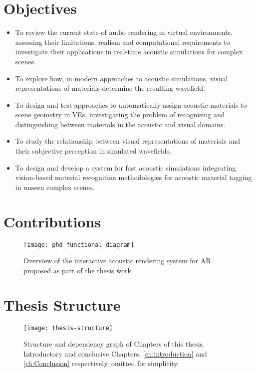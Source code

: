 \section{Objectives}
\begin{itemize}
    \item To review the current state of audio rendering in virtual environments, assessing their limitations, realism and computational requirements to investigate their applications in real-time acoustic simulations for complex scenes.
    \item To explore how, in modern approaches to acoustic simulations, visual representations of materials determine the resulting wavefield.
    \item To design and test approaches to automatically assign acoustic materials to scene geometry in VEs, investigating the problem of recognising and distinguishing between materials in the acoustic and visual domains.
    \item To study the relationship between visual representations of materials and their subjective perception in simulated wavefields.
    \item To design and develop a system for fast acoustic simulations integrating vision-based material recognition methodologies for acoustic material tagging in unseen complex scenes.
\end{itemize}

\section{Contributions}
\begin{figure}[htbp]
    \centering
    \texttt{[image: phd\_functional\_diagram]}
    \caption{Overview of the interactive acoustic rendering system for AR proposed as part of the thesis work.}
    \label{fig:proposed-system-diagram}
\end{figure}

\section{Thesis Structure}

\begin{figure}[htbp]
    \centering
    \texttt{[image: thesis-structure]}
    \caption{Structure and dependency graph of Chapters of this thesis. Introductory and conclusive Chapters, \ref{ch:introduction} and \ref{ch:Conclusion} respectively, omitted for simplicity.}
    \label{fig:thesis-structure}
\end{figure}


